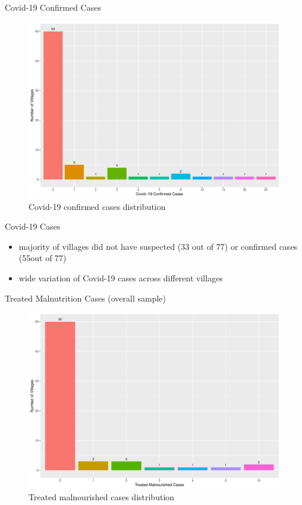 \documentclass[
  ignorenonframetext,
]{beamer}
\providecommand{\tightlist}{%
  \setlength{\itemsep}{0pt}\setlength{\parskip}{0pt}}
\begin{document}
\begin{frame}{Covid-19 Confirmed Cases}
\protect\hypertarget{covid-19-confirmed-cases}{}
\begin{figure}
\includegraphics[width=1\linewidth]{example_plots_files/figure-beamer/unnamed-chunk-9-1} \caption{Covid-19 confirmed cases distribution}\label{fig:unnamed-chunk-9}
\end{figure}
\end{frame}

\begin{frame}{Covid-19 Cases}
\protect\hypertarget{covid-19-cases}{}
\begin{itemize}
\tightlist
\item
  majority of villages did not have suspected (33 out of 77) or
  confirmed cases (55out of 77)
\item
  wide variation of Covid-19 cases across different villages
\end{itemize}
\end{frame}

\begin{frame}{Treated Malnutrition Cases (overall sample)}
\protect\hypertarget{malnut}{}
\begin{figure}
\includegraphics[width=1\linewidth]{example_plots_files/figure-beamer/unnamed-chunk-10-1} \caption{Treated malnourished cases distribution}\label{fig:unnamed-chunk-10}
\end{figure}
\end{frame}
\end{document}
